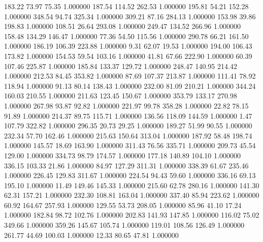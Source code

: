     183.22     73.97     75.35  1.000000
    187.54    114.52    262.53  1.000000
    195.81     54.21    152.28  1.000000
    348.54     94.74    325.34  1.000000
    309.21     87.16    284.13  1.000000
    153.98     39.86    198.83  1.000000
    108.51     26.64    293.08  1.000000
    249.47    134.52    266.96  1.000000
    158.48    134.29    146.47  1.000000
     77.36     54.50    115.56  1.000000
    290.78     66.21    161.50  1.000000
    186.19    106.39    223.88  1.000000
      9.31     62.07     19.53  1.000000
    194.00    106.43    173.82  1.000000
    154.53     59.54    103.16  1.000000
     41.81     67.66    222.90  1.000000
     60.39    107.46    225.87  1.000000
    185.84    133.37    129.72  1.000000
    248.47    140.95    214.42  1.000000
    212.53     84.45    353.82  1.000000
     87.69    107.37    213.87  1.000000
    111.41     78.92    118.94  1.000000
     91.13     80.14    138.43  1.000000
    232.00     81.09    210.21  1.000000
    344.24    160.03    210.55  1.000000
    211.63    123.45    150.67  1.000000
    353.79    133.17    270.98  1.000000
    267.98     93.87     92.82  1.000000
    221.97     99.78    358.28  1.000000
     22.82     78.15     91.89  1.000000
    214.37     89.75    115.71  1.000000
    136.56    118.09    144.59  1.000000
      1.47    107.79    322.82  1.000000
    296.35     20.73     29.25  1.000000
    189.27     51.99     90.55  1.000000
    232.34     57.70    162.46  1.000000
    215.63    150.64    313.04  1.000000
    187.92     58.48    198.74  1.000000
    145.57     18.69    163.90  1.000000
    311.43     76.56    335.71  1.000000
    209.73     45.54    129.00  1.000000
    334.73     98.79    174.57  1.000000
    177.18    140.89    104.10  1.000000
    336.15    103.33     21.86  1.000000
     84.97    127.29    311.31  1.000000
    338.39     61.67    235.46  1.000000
    226.45    129.83    311.67  1.000000
    224.54     94.43     59.60  1.000000
    336.16     69.13    195.10  1.000000
     11.49    149.46    145.33  1.000000
    215.60     62.78    280.16  1.000000
    141.30     62.31    157.21  1.000000
    232.30    108.81    163.04  1.000000
    337.40     85.94    223.62  1.000000
     60.92    164.67    257.93  1.000000
    129.55     53.73    208.05  1.000000
     85.96     41.10     17.24  1.000000
    182.84     98.72    102.76  1.000000
    202.83    141.93    147.85  1.000000
    116.02     75.02    349.66  1.000000
    359.26    145.67    105.74  1.000000
    119.01    108.56    126.49  1.000000
    261.77     44.69    100.03  1.000000
     12.33     80.65     47.81  1.000000
